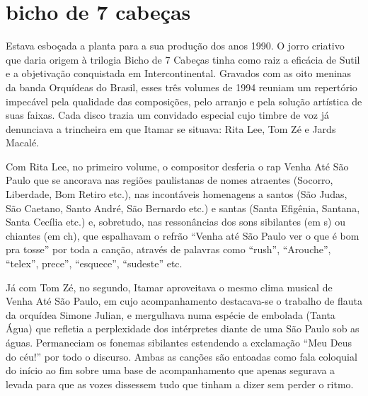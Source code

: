 \section{bicho de 7 cabeças}

Estava esboçada a planta para a sua produção dos anos 1990. O jorro
criativo que daria origem à trilogia Bicho de 7 Cabeças tinha como raiz
a eficácia de Sutil e a objetivação conquistada em Intercontinental.
Gravados com as oito meninas da banda Orquídeas do Brasil, esses três
volumes de 1994 reuniam um repertório impecável pela qualidade das
composições, pelo arranjo e pela solução artística de suas faixas. Cada
disco trazia um convidado especial cujo timbre de voz já denunciava a
trincheira em que Itamar se situava: Rita Lee, Tom Zé e Jards Macalé.

Com Rita Lee, no primeiro volume, o compositor desferia o rap Venha Até
São Paulo que se ancorava nas regiões paulistanas de nomes atraentes
(Socorro, Liberdade, Bom Retiro etc.), nas incontáveis homenagens a
santos (São Judas, São Caetano, Santo André, São Bernardo etc.) e santas
(Santa Efigênia, Santana, Santa Cecília etc.) e, sobretudo, nas
ressonâncias dos sons sibilantes (em s) ou chiantes (em ch), que
espalhavam o refrão ``Venha até São Paulo ver o que é bom pra tosse''
por toda a canção, através de palavras como ``rush'', ``Arouche'',
``telex'', prece'', ``esquece'', ``sudeste'' etc.

Já com Tom Zé, no segundo, Itamar aproveitava o mesmo clima musical de
Venha Até São Paulo, em cujo acompanhamento destacava-se o trabalho de
flauta da orquídea Simone Julian, e mergulhava numa espécie de embolada
(Tanta Água) que refletia a perplexidade dos intérpretes diante de uma
São Paulo sob as águas. Permaneciam os fonemas sibilantes estendendo a
exclamação ``Meu Deus do céu!'' por todo o discurso. Ambas as canções
são entoadas como fala coloquial do início ao fim sobre uma base de
acompanhamento que apenas segurava a levada para que as vozes dissessem
tudo que tinham a dizer sem perder o ritmo.

